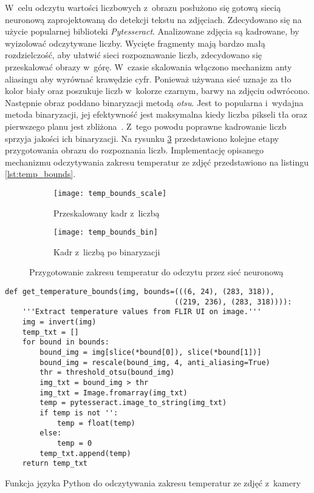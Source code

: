 W~celu odczytu wartości liczbowych z~obrazu posłużono się gotową siecią
neuronową zaprojektowaną do detekcji tekstu na zdjęciach.
Zdecydowano się na użycie popularnej biblioteki \emph{Pytesseract}.
Analizowane zdjęcia są kadrowane, by wyizolować odczytywane liczby.
Wycięte fragmenty mają bardzo małą rozdzielczość, aby ułatwić sieci
rozpoznawanie liczb, zdecydowano się przeskalować obrazy w~górę.
W~czasie skalowania włączono mechanizm anty aliasingu aby wyrównać krawędzie
cyfr.
Ponieważ używana sieć uznaje za tło kolor biały oraz poszukuje liczb w~kolorze
czarnym, barwy na zdjęciu odwrócono.
Następnie obraz poddano binaryzacji metodą \emph{otsu}.
Jest to popularna i~wydajna metoda binaryzacji, jej efektywność jest
maksymalna kiedy liczba pikseli tła oraz pierwszego planu jest
zbliżona~\cite{sezgin}.
Z~tego powodu poprawne kadrowanie liczb sprzyja jakości ich binaryzacji.
Na rysunku \ref{fig:temp_bounds} przedstawiono kolejne etapy przygotowania
obrazu do rozpoznania liczb.
Implementację opisanego mechanizmu odczytywania zakresu temperatur ze zdjęć
przedstawiono na listingu \ref{lst:temp_bounds}.
\begin{figure}[htbp]
	\centering
	\begin{subfigure}{0.45\textwidth}
		\centering
		\texttt{[image: temp\_bounds\_scale]}
		\caption{Przeskalowany kadr z~liczbą}
		\label{fig:temp_bounds_scale}
	\end{subfigure}
	\hspace{0.5cm}
	\begin{subfigure}{0.45\textwidth}
		\centering
		\texttt{[image: temp\_bounds\_bin]}
		\caption{Kadr z~liczbą po binaryzacji}
		\label{fig:temp_bounds_bin}
	\end{subfigure}
	\caption{Przygotowanie zakresu temperatur do odczytu przez sieć neuronową}
	\label{fig:temp_bounds}
\end{figure}

\begin{listing}[htbp]
\begin{verbatim}
def get_temperature_bounds(img, bounds=(((6, 24), (283, 318)),
                                       ((219, 236), (283, 318)))):
    '''Extract temperature values from FLIR UI on image.'''
    img = invert(img)
    temp_txt = []
    for bound in bounds:
        bound_img = img[slice(*bound[0]), slice(*bound[1])]
        bound_img = rescale(bound_img, 4, anti_aliasing=True)
        thr = threshold_otsu(bound_img)
        img_txt = bound_img > thr
        img_txt = Image.fromarray(img_txt)
        temp = pytesseract.image_to_string(img_txt)
        if temp is not '': 
            temp = float(temp)
        else:
            temp = 0
        temp_txt.append(temp)
    return temp_txt
\end{verbatim}
\caption{Funkcja języka Python do odczytywania zakresu temperatur ze zdjęć
         z~kamery}
\label{lst:temp_bounds}
\end{listing}

